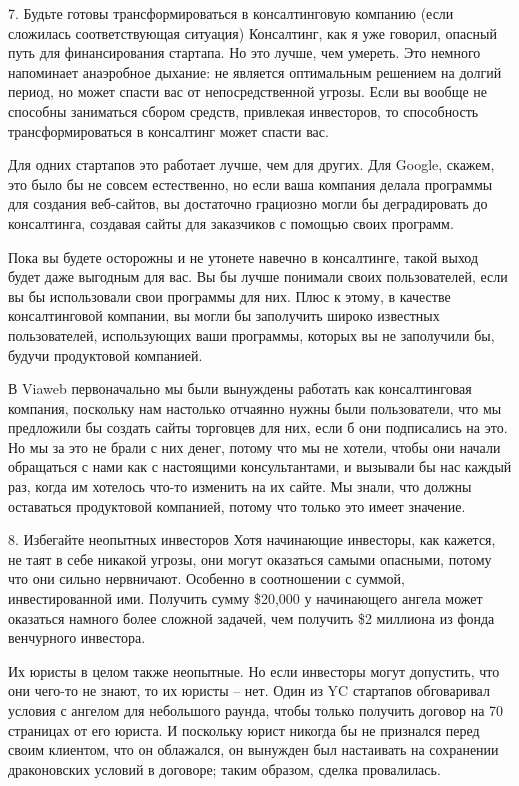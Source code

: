 \documentclass[ebook,12pt,oneside,openany]{memoir}
\begin{document}
7. Будьте готовы трансформироваться в консалтинговую компанию (если
сложилась соответствующая ситуация) Консалтинг, как я уже говорил,
опасный путь для финансирования стартапа. Но это лучше, чем умереть.
Это немного напоминает анаэробное дыхание: не является оптимальным
решением на долгий период, но может спасти вас от непосредственной
угрозы. Если вы вообще не способны заниматься сбором средств,
привлекая инвесторов, то способность трансформироваться в консалтинг
может спасти вас.

Для одних стартапов это работает лучше, чем для других. Для Google,
скажем, это было бы не совсем естественно, но если ваша компания
делала программы для создания веб-сайтов, вы достаточно грациозно
могли бы деградировать до консалтинга, создавая сайты для заказчиков с
помощью своих программ.

Пока вы будете осторожны и не утонете навечно в консалтинге, такой
выход будет даже выгодным для вас. Вы бы лучше понимали своих
пользователей, если вы бы использовали свои программы для них. Плюс к
этому, в качестве консалтинговой компании, вы могли бы заполучить
широко известных пользователей, использующих ваши программы, которых
вы не заполучили бы, будучи продуктовой компанией.

В Viaweb первоначально мы были вынуждены работать как консалтинговая
компания, поскольку нам настолько отчаянно нужны были пользователи,
что мы предложили бы создать сайты торговцев для них, если б они
подписались на это. Но мы за это не брали с них денег, потому что мы
не хотели, чтобы они начали обращаться с нами как с настоящими
консультантами, и вызывали бы нас каждый раз, когда им хотелось что-то
изменить на их сайте. Мы знали, что должны оставаться продуктовой
компанией, потому что только это имеет значение.

8. Избегайте неопытных инвесторов Хотя начинающие инвесторы, как
кажется, не таят в себе никакой угрозы, они могут оказаться самыми
опасными, потому что они сильно нервничают. Особенно в соотношении с
суммой, инвестированной ими. Получить сумму \$20,000 у начинающего
ангела может оказаться намного более сложной задачей, чем получить \$2
миллиона из фонда венчурного инвестора.

Их юристы в целом также неопытные. Но если инвесторы могут допустить,
что они чего-то не знают, то их юристы – нет. Один из YC стартапов
обговаривал условия с ангелом для небольшого раунда, чтобы только
получить договор на 70 страницах от его юриста. И поскольку юрист
никогда бы не признался перед своим клиентом, что он облажался, он
вынужден был настаивать на сохранении драконовских условий в договоре;
таким образом, сделка провалилась.
\end{document}
